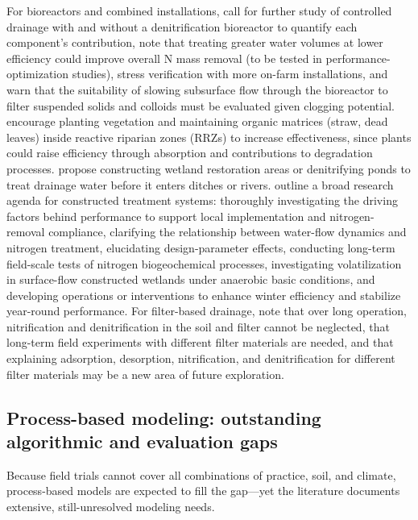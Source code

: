 For bioreactors and combined installations, \textcite{Husk2017} call for further study of controlled drainage with and without a denitrification bioreactor to quantify each component's contribution, note that treating greater water volumes at lower efficiency could improve overall N mass removal (to be tested in performance-optimization studies), stress verification with more on-farm installations, and warn that the suitability of slowing subsurface flow through the bioreactor to filter suspended solids and colloids must be evaluated given clogging potential. \textcite{Vallée2014} encourage planting vegetation and maintaining organic matrices (straw, dead leaves) inside reactive riparian zones (RRZs) to increase effectiveness, since plants could raise efficiency through absorption and contributions to degradation processes. \textcite{Randall2001} propose constructing wetland restoration areas or denitrifying ponds to treat drainage water before it enters ditches or rivers. \textcite{Mendes2021} outline a broad research agenda for constructed treatment systems: thoroughly investigating the driving factors behind performance to support local implementation and nitrogen-removal compliance, clarifying the relationship between water-flow dynamics and nitrogen treatment, elucidating design-parameter effects, conducting long-term field-scale tests of nitrogen biogeochemical processes, investigating volatilization in surface-flow constructed wetlands under anaerobic basic conditions, and developing operations or interventions to enhance winter efficiency and stabilize year-round performance. For filter-based drainage, \textcite{Tao2022} note that over long operation, nitrification and denitrification in the soil and filter cannot be neglected, that long-term field experiments with different filter materials are needed, and that explaining adsorption, desorption, nitrification, and denitrification for different filter materials may be a new area of future exploration.

\subsection{Process-based modeling: outstanding algorithmic and evaluation gaps}
Because field trials cannot cover all combinations of practice, soil, and climate, process-based models are expected to fill the gap---yet the literature documents extensive, still-unresolved modeling needs.

